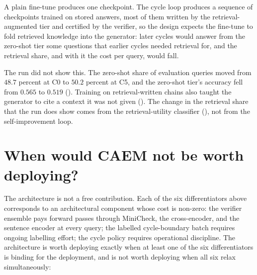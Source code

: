 A plain fine-tune produces one checkpoint. The cycle loop produces a sequence of checkpoints trained on stored answers, most of them written by the retrieval-augmented tier and certified by the verifier, so the design expects the fine-tune to fold retrieved knowledge into the generator: later cycles would answer from the zero-shot tier some questions that earlier cycles needed retrieval for, and the retrieval share, and with it the cost per query, would fall.

The run did not show this. The zero-shot share of evaluation queries moved from $48.7$ percent at C0 to $50.2$ percent at C5, and the zero-shot tier's accuracy fell from $0.565$ to $0.519$ (). Training on retrieval-written chains also taught the generator to cite a context it was not given (). The change in the retrieval share that the run does show comes from the retrieval-utility classifier (), not from the self-improvement loop.


\section[When not to deploy]{When would CAEM not be worth deploying?}
\label{app:qa-when-not}

The architecture is not a free contribution. Each of the six differentiators above corresponds to an architectural component whose cost is non-zero: the verifier ensemble pays forward passes through MiniCheck, the cross-encoder, and the sentence encoder at every query; the labelled cycle-boundary batch requires ongoing labelling effort; the cycle policy requires operational discipline. The architecture is worth deploying exactly when at least one of the six differentiators is binding for the deployment, and is not worth deploying when all six relax simultaneously:


